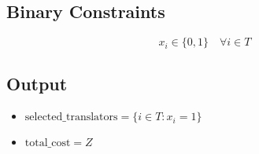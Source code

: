 \documentclass{article}
\begin{document}
\subsection*{Binary Constraints}
\[
x_i \in \{0, 1\} \quad \forall i \in T
\]

\subsection*{Output}
\begin{itemize}
    \item \( \text{selected\_translators} = \{i \in T : x_i = 1\} \)
    \item \( \text{total\_cost} = Z \)
\end{itemize}
\end{document}

